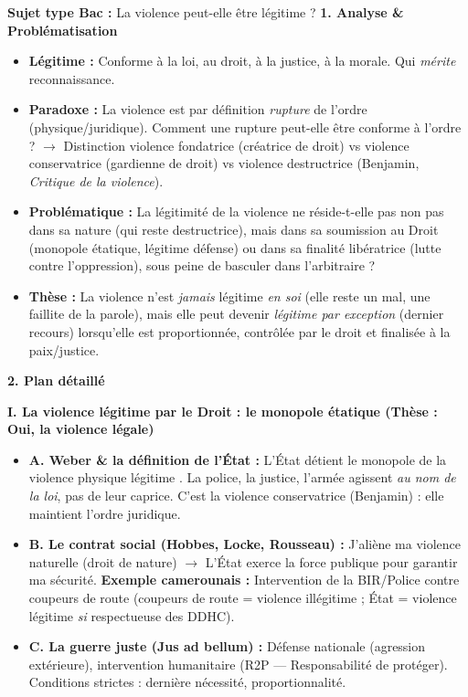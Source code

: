\documentclass[11pt]{article}
\newcommand{\cle}[1]{{\popxbold\color{popdark}#1}}
\begin{document}
\begin{exoresolu}
\textbf{Sujet type Bac :} \guillemotleft La violence peut-elle être légitime ? \guillemotright
\tcblower
\textbf{1. Analyse \& Problématisation}
\begin{itemize}
    \item \textbf{Légitime :} Conforme à la loi, au droit, à la justice, à la morale. Qui \emph{mérite} reconnaissance.
    \item \textbf{Paradoxe :} La violence est par définition \emph{rupture} de l'ordre (physique/juridique). Comment une rupture peut-elle être conforme à l'ordre ? $\rightarrow$ Distinction \cle{violence fondatrice} (créatrice de droit) vs \cle{violence conservatrice} (gardienne de droit) vs \cle{violence destructrice} (Benjamin, \emph{Critique de la violence}).
    \item \textbf{Problématique :} La légitimité de la violence ne réside-t-elle pas non pas dans sa nature (qui reste destructrice), mais dans sa \cle{soumission au Droit} (monopole étatique, légitime défense) ou dans sa \cle{finalité libératrice} (lutte contre l'oppression), sous peine de basculer dans l'arbitraire ?
    \item \textbf{Thèse :} La violence n'est \emph{jamais} légitime \emph{en soi} (elle reste un mal, une faillite de la parole), mais elle peut devenir \emph{légitime par exception} (dernier recours) lorsqu'elle est \cle{proportionnée}, \cle{contrôlée par le droit} et \cle{finalisée à la paix/justice}.
\end{itemize}

\textbf{2. Plan détaillé}

\textbf{I. La violence légitime par le Droit : le monopole étatique (Thèse : Oui, la violence légale)}
\begin{itemize}
    \item \textbf{A. Weber \& la définition de l'État :} \guillemotleft L'État détient le monopole de la violence physique légitime \guillemotright. La police, la justice, l'armée agissent \emph{au nom de la loi}, pas de leur caprice. C'est la \cle{violence conservatrice} (Benjamin) : elle maintient l'ordre juridique.
    \item \textbf{B. Le contrat social (Hobbes, Locke, Rousseau) :} J'aliène ma violence naturelle (droit de nature) $\rightarrow$ L'État exerce la \cle{force publique} pour garantir ma sécurité. \textbf{Exemple camerounais :} Intervention de la BIR/Police contre coupeurs de route (coupeurs de route = violence illégitime ; État = violence légitime \emph{si} respectueuse des DDHC).
    \item \textbf{C. La guerre juste (Jus ad bellum) :} Défense nationale (agression extérieure), intervention humanitaire (R2P — Responsabilité de protéger). Conditions strictes : dernière nécessité, proportionnalité.
\end{itemize}


\end{exoresolu}
\end{document}
